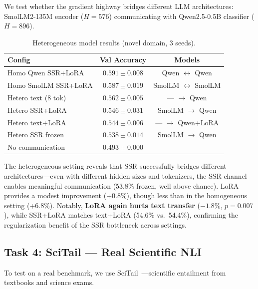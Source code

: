\documentclass[11pt,a4paper]{article}
\begin{document}
We test whether the gradient highway bridges different LLM architectures: SmolLM2-135M encoder ($H{=}576$) communicating with Qwen2.5-0.5B classifier ($H{=}896$).

\begin{table}[h]
\centering
\caption{Heterogeneous model results (novel domain, 3 seeds).}
\vspace{0.3em}
\begin{tabular}{@{}lcc@{}}
\toprule
\textbf{Config} & \textbf{Val Accuracy} & \textbf{Models} \\
\midrule
Homo Qwen SSR+LoRA   & $0.591 \pm 0.008$ & Qwen $\leftrightarrow$ Qwen \\
Homo SmolLM SSR+LoRA & $0.587 \pm 0.019$ & SmolLM $\leftrightarrow$ SmolLM \\
\midrule
Hetero text (8 tok)   & $0.562 \pm 0.005$ & --- $\to$ Qwen \\
Hetero SSR+LoRA       & $0.546 \pm 0.031$ & SmolLM $\to$ Qwen \\
Hetero text+LoRA      & $0.544 \pm 0.006$ & --- $\to$ Qwen+LoRA \\
Hetero SSR frozen     & $0.538 \pm 0.014$ & SmolLM $\to$ Qwen \\
No communication      & $0.493 \pm 0.000$ & --- \\
\bottomrule
\end{tabular}
\end{table}

The heterogeneous setting reveals that SSR successfully bridges different architectures---even with different hidden sizes and tokenizers, the SSR channel enables meaningful communication (53.8\% frozen, well above chance). LoRA provides a modest improvement (+0.8\%), though less than in the homogeneous setting (+6.8\%). Notably, \textbf{LoRA again hurts text transfer} ($-1.8\%$, $p{=}0.007$), while SSR+LoRA matches text+LoRA (54.6\% vs.\ 54.4\%), confirming the regularization benefit of the SSR bottleneck across settings.

\subsection{Task 4: SciTail --- Real Scientific NLI}

To test on a real benchmark, we use SciTail~\cite{khot2018scitail}---scientific entailment from textbooks and science exams.
\end{document}
